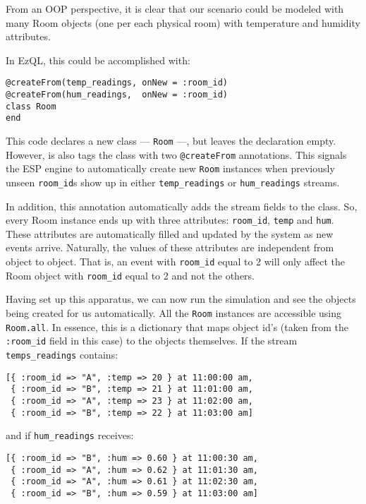 \documentclass{report}
\begin{document}
From an OOP perspective, it is clear that our scenario could be
modeled with many Room objects (one per each physical room) with
temperature and humidity attributes.

In EzQL, this could be accomplished with:

\begin{verbatim}
@createFrom(temp_readings, onNew = :room_id)
@createFrom(hum_readings,  onNew = :room_id)
class Room
end
\end{verbatim}

This code declares a new class --- \verb=Room= ---, but leaves the
declaration empty. However, is also tags the class with two
\verb=@createFrom= annotations. This signals the ESP engine to
automatically create new \verb=Room= instances when previously unseen
\verb=room_id=s show up in either \verb=temp_readings= or
\verb=hum_readings= streams.

In addition, this annotation automatically adds the stream fields to
the class. So, every Room instance ends up with three attributes:
\verb=room_id=, \verb=temp= and \verb=hum=. These attributes are
automatically filled and updated by the system as new events
arrive. Naturally, the values of these attributes are independent from
object to object. That is, an event with \verb=room_id= equal to 2
will only affect the Room object with \verb=room_id= equal to 2 and
not the others.

Having set up this apparatus, we can now run the simulation and see
the objects being created for us automatically. All the \verb=Room=
instances are accessible using \verb=Room.all=. In essence, this is a
dictionary that maps object id's (taken from the \verb=:room_id= field
in this case) to the objects themselves. If the stream
\verb=temps_readings= contains:

\begin{verbatim}
[{ :room_id => "A", :temp => 20 } at 11:00:00 am,
 { :room_id => "B", :temp => 21 } at 11:01:00 am,
 { :room_id => "A", :temp => 23 } at 11:02:00 am,
 { :room_id => "B", :temp => 22 } at 11:03:00 am]
\end{verbatim}

and if \verb=hum_readings= receives:

\begin{verbatim}
[{ :room_id => "B", :hum => 0.60 } at 11:00:30 am,
 { :room_id => "A", :hum => 0.62 } at 11:01:30 am,
 { :room_id => "A", :hum => 0.61 } at 11:02:30 am,
 { :room_id => "B", :hum => 0.59 } at 11:03:00 am]
\end{verbatim}
\end{document}

